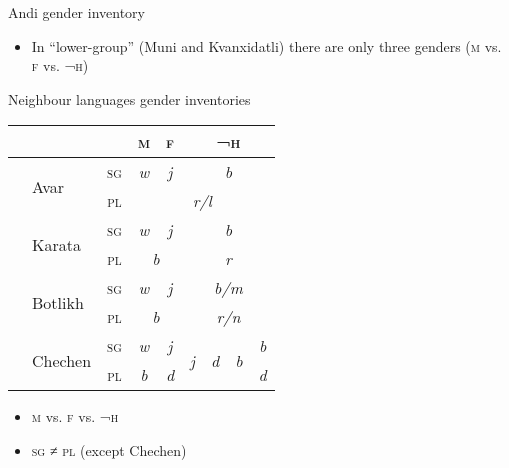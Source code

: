 \documentclass[13pt, t]{beamer}
\begin{document}
\begin{frame}{Andi gender inventory}
\begin{itemize}
\item In ``lower-group'' (Muni and Kvanxidatli) there are only three genders  (\textsc{m} vs. \textsc{f} vs. \textsc{¬h})
 


\end{itemize}
\end{frame}



\begin{frame}{Neighbour languages gender inventories}
\begin{tabular}{|l|l|c|c|c|c|c|c|c|}
\hline
\multicolumn{ 3}{|l|}{}& \textsc{m} & \textsc{f} & \multicolumn{ 4}{c|}{\textsc{¬h}} \\ \hline
\multirow{ 2}{*}{\cite[41]{alekseev97}} & \multirow{ 2}{*}{Avar} & \textsc{sg} & \textit{w} & \textit{j} & \multicolumn{ 4}{c|}{\textit{b}} \\ \cline{ 3- 9}
\multicolumn{ 1}{|l|}{} & \multicolumn{ 1}{l|}{} & \textsc{pl} & \multicolumn{ 6}{c|}{\textit{r/l}} \\ \hline
\multirow{ 2}{*}{\cite[41]{magomedbekova71}} & \multirow{ 2}{*}{Karata} & \textsc{sg} & \textit{w} & \textit{j} & \multicolumn{ 4}{c|}{\textit{b}} \\ \cline{ 3- 9}
\multicolumn{ 1}{|l|}{} & \multicolumn{ 1}{l|}{} & \textsc{pl} & \multicolumn{ 2}{c|}{\textit{b}} & \multicolumn{ 4}{c|}{\textit{r}} \\ \hline
\multirow{ 2}{*}{\cite[253--254]{gudava62}} & \multirow{ 2}{*}{Botlikh} & \textsc{sg} & \textit{w} & \textit{j} & \multicolumn{ 4}{c|}{\textit{b/m}} \\ \cline{ 3- 9}
\multicolumn{ 1}{|l|}{} & \multicolumn{ 1}{l|}{} & \textsc{pl} & \multicolumn{ 2}{c|}{\textit{b}} & \multicolumn{ 4}{c|}{\textit{r/n}} \\ \hline
\multirow{ 2}{*}{\cite[21--22]{nichols94}} & \multirow{ 2}{*}{Chechen} & \textsc{sg} & \textit{w} & \textit{j} & \multirow{ 2}{*}{\textit{j}} & \multirow{ 2}{*}{\textit{d}} & \multirow{ 2}{*}{\textit{b}} & \textit{b} \\ \cline{ 3- 5} \cline{ 9- 9}
\multicolumn{ 1}{|l|}{} & \multicolumn{ 1}{l|}{} & \textsc{pl} & \textit{b} & \textit{d} &  & & & \textit{d} \\ \hline
\end{tabular}
\vfill
\begin{itemize}
\item \textsc{m} vs. \textsc{f} vs. \textsc{¬h}
\item \textsc{sg} ≠ \textsc{pl} (except Chechen)
\end{itemize}
\end{frame}
\end{document}
